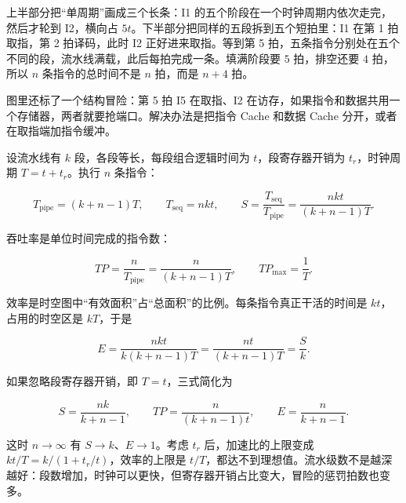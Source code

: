 \begin{center}
\end{center}

上半部分把“单周期”画成三个长条：I1 的五个阶段在一个时钟周期内依次走完，然后才轮到 I2，横向占 $5t$。下半部分把同样的五段拆到五个短拍里：I1 在第 1 拍取指，第 2 拍译码，此时 I2 正好进来取指。等到第 5 拍，五条指令分别处在五个不同的段，流水线满载，此后每拍完成一条。填满阶段要 $5$ 拍，排空还要 $4$ 拍，所以 $n$ 条指令的总时间不是 $n$ 拍，而是 $n+4$ 拍。

图里还标了一个结构冒险：第 5 拍 I5 在取指、I2 在访存，如果指令和数据共用一个存储器，两者就要抢端口。解决办法是把指令 Cache 和数据 Cache 分开，或者在取指端加指令缓冲。

设流水线有 $k$ 段，各段等长，每段组合逻辑时间为 $t$，段寄存器开销为 $t_r$，时钟周期 $T=t+t_r$。执行 $n$ 条指令：

\[
T_{\text{pipe}}=(k+n-1)T,
\qquad
T_{\text{seq}}=nkt,
\qquad
S=\frac{T_{\text{seq}}}{T_{\text{pipe}}}=\frac{nkt}{(k+n-1)T}.
\]

吞吐率是单位时间完成的指令数：

\[
TP=\frac{n}{T_{\text{pipe}}}=\frac{n}{(k+n-1)T},
\qquad
TP_{\max}=\frac{1}{T}.
\]

效率是时空图中“有效面积”占“总面积”的比例。每条指令真正干活的时间是 $kt$，占用的时空区是 $kT$，于是

\[
E=\frac{nkt}{k(k+n-1)T}=\frac{nt}{(k+n-1)T}=\frac{S}{k}.
\]

如果忽略段寄存器开销，即 $T=t$，三式简化为

\[
S=\frac{nk}{k+n-1},\qquad
TP=\frac{n}{(k+n-1)t},\qquad
E=\frac{n}{k+n-1}.
\]

这时 $n\to\infty$ 有 $S\to k$、$E\to1$。考虑 $t_r$ 后，加速比的上限变成 $kt/T=k/(1+t_r/t)$，效率的上限是 $t/T$，都达不到理想值。流水级数不是越深越好：段数增加，时钟可以更快，但寄存器开销占比变大，冒险的惩罚拍数也变多。

